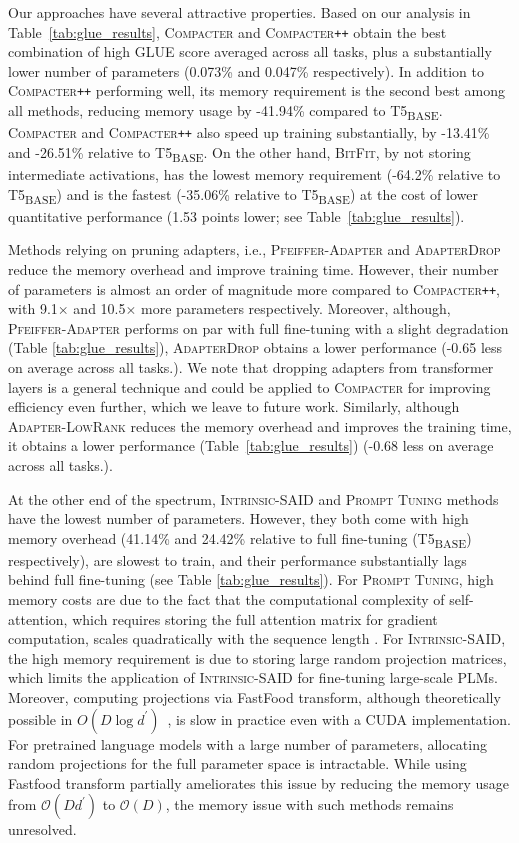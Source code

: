 \documentclass{article}
\newcommand{\basebase}{T5\textsubscript{\tiny BASE}\xspace}
\newcommand{\adapterlowrank}{\textsc{Adapter-LowRank}\xspace}
\newcommand{\compacter}{\textsc{Compacter}\xspace}
\newcommand{\compacteronlyff}{\textsc{Compacter}\texttt{++}\xspace} %
\newcommand{\intrinsic}{\textsc{Intrinsic-SAID}\xspace}
\newcommand{\prompttuning}{\textsc{Prompt Tuning}\xspace}
\newcommand{\pfeifferadapter}{\textsc{Pfeiffer-Adapter}\xspace}
\newcommand{\glue}{\textsc{GLUE}\xspace}
\newcommand{\adapterdrop}{\textsc{AdapterDrop}\xspace}
\newcommand{\bitfit}{\textsc{BitFit}\xspace}
\begin{document}
Our approaches have several attractive properties. Based on our analysis in Table~\ref{tab:glue_results}, \compacter and \compacteronlyff obtain the best combination of high  \glue score averaged across all tasks, plus a substantially lower number of parameters (0.073\% and 0.047\% respectively).  
In addition to \compacteronlyff performing well, its memory requirement is the second best among all methods, reducing  memory usage by -41.94\% compared to \basebase. \compacter and \compacteronlyff also speed up training substantially, by -13.41\% and -26.51\% relative to \basebase. On the other hand, \bitfit, by not storing intermediate activations, has the lowest memory requirement (-64.2\% relative to \basebase) and is the fastest (-35.06\% relative to \basebase) at the cost of lower quantitative performance  (1.53 points lower; see Table~\ref{tab:glue_results}).


Methods relying on pruning adapters, i.e., \pfeifferadapter and \adapterdrop reduce the memory overhead and improve training  time. However, their number of parameters is almost an order of magnitude more compared to \compacteronlyff, with 9.1$\times$ and 10.5$\times$ more parameters respectively. Moreover, although, \pfeifferadapter performs on par with full fine-tuning with a slight degradation (Table \ref{tab:glue_results}), \adapterdrop obtains a lower performance (-0.65 less on average across all tasks.). We note that dropping adapters from transformer layers is a general technique and could be applied to \compacter for improving efficiency even further, which we leave to future work. Similarly, although \adapterlowrank reduces the memory overhead and improves the training time, it obtains a lower performance (Table~\ref{tab:glue_results}) (-0.68 less on average across all tasks.).

At the other end of the spectrum, \intrinsic and \prompttuning methods have the lowest number of parameters. However, they both come with high memory overhead (41.14\% and 24.42\% relative to full fine-tuning (\basebase) respectively), are slowest to train, and their performance substantially lags behind full fine-tuning (see Table \ref{tab:glue_results}). For \prompttuning, high memory costs are due to the fact that the computational complexity of self-attention, which requires storing the full attention matrix for gradient computation, scales quadratically with the sequence length \cite{wang2020linformer}. For  \intrinsic, the high memory requirement is due to storing large random projection matrices, which limits the application of \intrinsic for fine-tuning large-scale PLMs. Moreover, computing projections via FastFood transform, although theoretically possible in $O(D \log d^{\prime})$~\citep{le2013fastfood}, is slow in practice even with a CUDA implementation. For pretrained language models with a large number of parameters, allocating random projections for the full parameter space is intractable.
While using Fastfood transform partially ameliorates this issue by reducing the memory usage from $\mathcal{O}(Dd^{\prime})$ to $\mathcal{O}(D)$, the memory issue with such methods remains unresolved.
\end{document}
